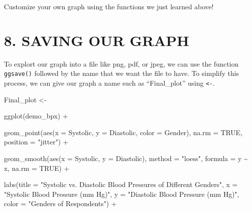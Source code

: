 \documentclass[
]{book}
\newenvironment{Shaded}{\begin{snugshade}}{\end{snugshade}}
\newcommand{\AttributeTok}[1]{\textcolor[rgb]{0.77,0.63,0.00}{#1}}
\newcommand{\ConstantTok}[1]{\textcolor[rgb]{0.00,0.00,0.00}{#1}}
\newcommand{\FunctionTok}[1]{\textcolor[rgb]{0.00,0.00,0.00}{#1}}
\newcommand{\NormalTok}[1]{#1}
\newcommand{\OtherTok}[1]{\textcolor[rgb]{0.56,0.35,0.01}{#1}}
\newcommand{\SpecialCharTok}[1]{\textcolor[rgb]{0.00,0.00,0.00}{#1}}
\newcommand{\StringTok}[1]{\textcolor[rgb]{0.31,0.60,0.02}{#1}}
\begin{document}
Customize your own graph using the functions we just learned above!

\hypertarget{saving-our-graph}{%
\section{8. SAVING OUR GRAPH}\label{saving-our-graph}}

To explort our graph into a file like png, pdf, or jpeg, we can use the function \texttt{ggsave()} followed by the name that we want the file to have. To simplify this process, we can give our graph a name such as ``Final\_plot'' using \texttt{\textless{}-}.

\begin{Shaded}
\begin{Highlighting}[]
\NormalTok{Final\_plot }\OtherTok{\textless{}{-}}

    \FunctionTok{ggplot}\NormalTok{(demo\_bpx) }\SpecialCharTok{+}

    \FunctionTok{geom\_point}\NormalTok{(}\FunctionTok{aes}\NormalTok{(}\AttributeTok{x =}\NormalTok{ Systolic, }\AttributeTok{y =}\NormalTok{ Diastolic, }\AttributeTok{color =}\NormalTok{ Gender), }
             \AttributeTok{na.rm =} \ConstantTok{TRUE}\NormalTok{,}
             \AttributeTok{position =} \StringTok{"jitter"}\NormalTok{) }\SpecialCharTok{+}

    \FunctionTok{geom\_smooth}\NormalTok{(}\FunctionTok{aes}\NormalTok{(}\AttributeTok{x =}\NormalTok{ Systolic, }\AttributeTok{y =}\NormalTok{ Diastolic), }
                \AttributeTok{method =} \StringTok{"loess"}\NormalTok{,}
                \AttributeTok{formula =}\NormalTok{ y }\SpecialCharTok{\textasciitilde{}}\NormalTok{ x,}
                \AttributeTok{na.rm =} \ConstantTok{TRUE}\NormalTok{) }\SpecialCharTok{+}

    \FunctionTok{labs}\NormalTok{(}\AttributeTok{title =} \StringTok{"Systolic vs. Diastolic Blood Pressures of Different Genders"}\NormalTok{,}
         \AttributeTok{x =} \StringTok{"Systolic Blood Pressure (mm Hg)"}\NormalTok{, }
         \AttributeTok{y =} \StringTok{"Diastolic Blood Pressure (mm Hg)"}\NormalTok{,}
         \AttributeTok{color =} \StringTok{"Genders of Respondents"}\NormalTok{) }\SpecialCharTok{+}


\end{Highlighting}
\end{Shaded}
\end{document}
